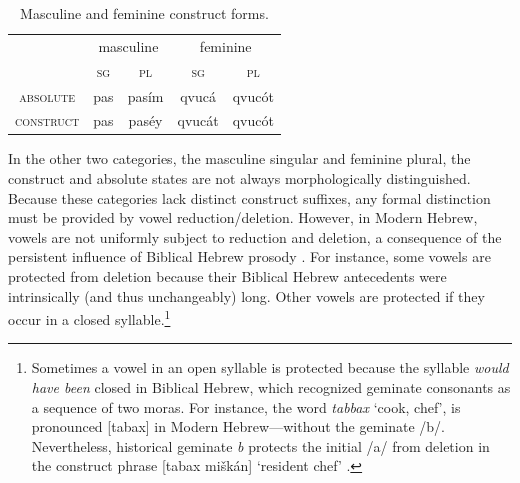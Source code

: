 \begin{description}
   \begin{table}[t]
      \centering
      \setlength{\extrarowheight}{8pt}
         \small
      \begin{tabular}{ccccc} 
 \toprule
 &  \multicolumn{2}{c}{masculine} & \multicolumn{2}{c}{feminine} \\
 &  \textsc{sg} & \textsc{pl} & \textsc{sg} & \textsc{pl} \\
 \cmidrule{2-3} \cmidrule{4-5}
   \textsc{absolute} & pas & pas\'{i}m  & qvuc\'{a}	& qvuc\'{o}t \\
     \textsc{construct} & pas & pas\'{e}y & qvuc\'{a}t	& qvuc\'{o}t\\
    \bottomrule
    \end{tabular}
          \label{tab:cstr-endings}
     \caption{Masculine and feminine construct forms.}
    \end{table}
    
In the other two categories, the masculine singular and feminine plural, the construct and absolute states are not always morphologically distinguished. Because these categories lack distinct construct suffixes, any formal distinction must be provided by vowel reduction/deletion. However, in Modern Hebrew, vowels are not uniformly subject to reduction and deletion, a consequence of the persistent influence of Biblical Hebrew prosody \citep{morag:1959, bolozky:1997, ravid-and-shlesinger:2001}. 
For instance, some vowels are protected from deletion because their 
Biblical Hebrew antecedents were intrinsically (and thus unchangeably) long. 
Other vowels are protected if they occur in a closed syllable.\footnote{Sometimes 
a vowel in an open syllable is protected because the syllable \emph{would have been} 
closed in Biblical Hebrew, which recognized geminate consonants as a sequence of two 
moras. For instance, the word \textit{tabbax} `cook, chef', is pronounced [tabax] in Modern Hebrew---without the geminate /b/. Nevertheless, historical geminate \textit{b} protects the initial /a/ from deletion in the construct phrase [tabax  mi\v{s}k\'an] `resident chef' \citep[see][p. 43]{bolozky-and-schwarzwald:1990}.}


\end{description}
